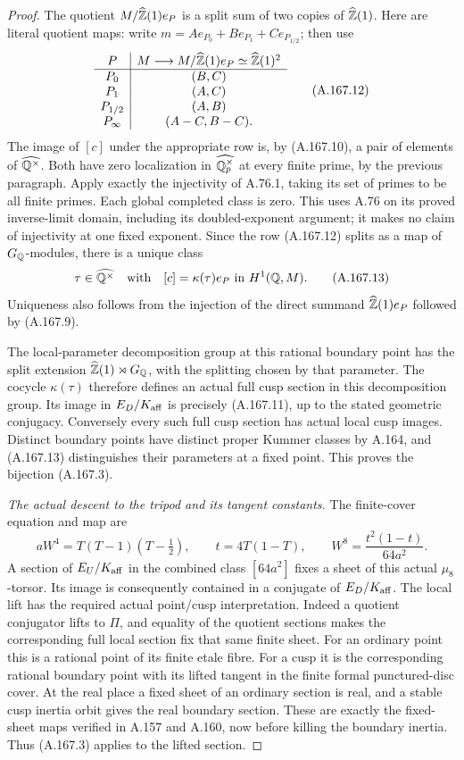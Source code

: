 \begin{proof}
The quotient \(M/\widehat{\mathbb Z}(1)e_P\) is a split sum of two
copies of \(\widehat{\mathbb Z}(1)\).  Here are literal quotient maps:
write \(m=Ae_{P_0}+Be_{P_1}+Ce_{P_{1/2}}\); then use
\[
 \begin{array}{c|c}
 P& M\longrightarrow M/\widehat{\mathbb Z}(1)e_P\simeq\widehat{\mathbb Z}(1)^2\\\hline
 P_0&(B,C)\\
 P_1&(A,C)\\
 P_{1/2}&(A,B)\\
 P_\infty&(A-C,B-C).
 \end{array}
\tag{A.167.12}
\]
The image of \([c]\) under the appropriate row is, by
(A.167.10), a pair of elements of \(\widehat{\mathbb Q^\times}\).
Both have zero localization in \(\widehat{\mathbb Q_p^\times}\)
at every finite prime, by the previous paragraph.  Apply exactly the
injectivity of A.76.1, taking its set of primes to be all finite
primes.  Each global completed class is zero.  This uses A.76 on its
proved inverse-limit domain, including its doubled-exponent argument;
it makes no claim of injectivity at one fixed exponent.  Since the
row (A.167.12) splits as a map of \(G_\mathbb Q\)-modules, there is a
unique class
\[
              \tau\in\widehat{\mathbb Q^\times}
                    \quad\text{with}\quad[c]=\kappa(\tau)e_P
                         \text{ in }H^1(\mathbb Q,M).
\tag{A.167.13}
\]
Uniqueness also follows from the injection of the direct summand
\(\widehat{\mathbb Z}(1)e_P\) followed by (A.167.9).

The local-parameter decomposition group at this rational boundary
point has the split extension
\(\widehat{\mathbb Z}(1)\rtimes G_\mathbb Q\), with the splitting chosen by
that parameter.  The cocycle \(\kappa(\tau)\) therefore defines
an actual full cusp section in this decomposition group.  Its image
in \(E_D/K_{\rm aff}\) is precisely (A.167.11), up to the stated
geometric conjugacy.  Conversely every such full cusp section has
actual local cusp images.  Distinct boundary points have distinct
proper Kummer classes by A.164, and (A.167.13) distinguishes their
parameters at a fixed point.  This proves the bijection (A.167.3).

\emph{The actual descent to the tripod and its tangent constants.}
The finite-cover equation and map are
\[
       aW^4=T(T-1)(T-\tfrac12),\qquad t=4T(1-T),
       \qquad W^8=\frac{t^2(1-t)}{64a^2}.
\tag{A.167.14}
\]
A section of \(E_U/K_{\rm aff}\) in the combined class
\([64a^2]\) fixes a sheet of this actual \(\mu_8\)-torsor.
Its image is consequently contained in a conjugate of
\(E_D/K_{\rm aff}\).  The local lift has the required actual
point/cusp interpretation.  Indeed a quotient conjugator lifts to
\(\Pi\), and equality of the quotient sections makes the
corresponding full local section fix that same finite sheet.  For an
ordinary point this is a rational point of its finite etale fibre.
For a cusp it is the corresponding rational boundary point with its
lifted tangent in the finite formal punctured-disc cover.  At the real
place a fixed sheet of an ordinary section is real, and a stable cusp
inertia orbit gives the real boundary section.  These are exactly the
fixed-sheet maps verified in A.157 and A.160, now before killing the
boundary inertia.  Thus (A.167.3) applies to the lifted section.


\end{proof}

